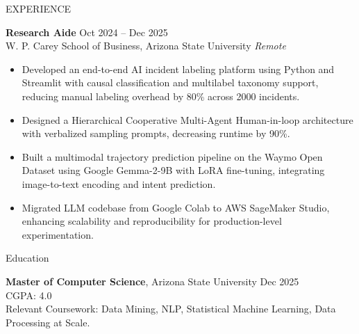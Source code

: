 \documentclass{resume} %
\begin{document}
\begin{rSection}{EXPERIENCE}

\textbf{Research Aide} \hfill Oct 2024 -- Dec 2025\\
W. P. Carey School of Business, Arizona State University \hfill \textit{Remote}
 \begin{itemize}
    \itemsep -3pt {}
     \item Developed an end-to-end AI incident labeling platform using Python and Streamlit with causal classification and multilabel taxonomy support, reducing manual labeling overhead by 80\% across 2000 incidents.
     \item Designed a Hierarchical Cooperative Multi-Agent Human-in-loop architecture with verbalized sampling prompts, decreasing runtime by 90\%.
     \item Built a multimodal trajectory prediction pipeline on the Waymo Open Dataset using Google Gemma-2-9B with LoRA fine-tuning, integrating image-to-text encoding and intent prediction.
     \item Migrated LLM codebase from Google Colab to AWS SageMaker Studio, enhancing scalability and reproducibility for production-level experimentation.
 \end{itemize}

\end{rSection}

\begin{rSection}{Education}

{\bf Master of Computer Science}, Arizona State University \hfill {Dec 2025}\\
CGPA: 4.0 \\
Relevant Coursework: Data Mining, NLP, Statistical Machine Learning, Data Processing at Scale.

\end{rSection}
\end{document}
